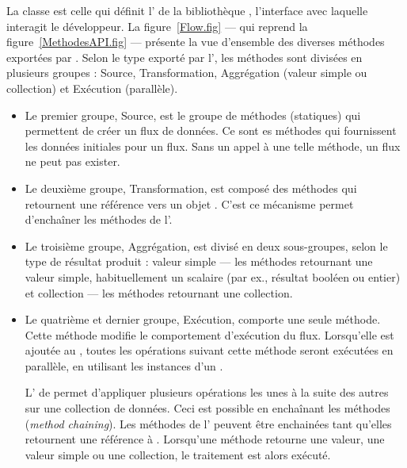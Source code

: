La classe  est celle qui définit l' de la biblioth\`eque , l'interface avec laquelle interagit le d\'eveloppeur. La figure~\ref{Flow.fig} --- qui reprend la figure~\ref{MethodesAPI.fig} --- pr\'esente la vue d'ensemble des diverses m\'ethodes export\'ees par . Selon le type export\'e par l', les m\'ethodes sont divis\'ees en plusieurs groupes : Source, Transformation, Aggr\'egation (valeur simple ou collection) et Ex\'ecution (parallèle).

\begin{itemize}

\item Le premier groupe, Source, est le groupe de méthodes (statiques) qui permettent de créer un flux de donn\'ees. Ce sont es m\'ethodes qui fournissent les donn\'ees initiales pour un flux. Sans un appel \`a une telle m\'ethode, un flux ne peut pas exister. 

\item Le deuxi\`eme groupe, Transformation, est composé des m\'ethodes qui retournent une r\'ef\'erence vers un objet . C'est ce m\'ecanisme permet d'encha\^iner les m\'ethodes de l'.

\item Le troisi\`eme groupe, Aggr\'egation, est divis\'e en deux sous-groupes, selon le type de r\'esultat produit : valeur simple --- les m\'ethodes retournant une valeur simple, habituellement un scalaire (par ex., r\'esultat bool\'een ou entier) et collection --- les m\'ethodes retournant une collection.

\item Le quatrième et dernier groupe, Exécution, comporte une seule m\'ethode. Cette m\'ethode modifie le comportement d'ex\'ecution du flux. Lorsqu'elle est ajout\'ee au  , toutes les op\'erations suivant cette m\'ethode seront ex\'ecut\'ees en parall\`ele, en utilisant les instances d'un  .

L' de  permet d'appliquer plusieurs op\'erations les unes à la suite des autres sur une collection de donn\'ees. Ceci est possible en encha\^inant les m\'ethodes (\emph{method chaining}). Les m\'ethodes de l' peuvent \^etre enchain\'ees tant qu'elles retournent une r\'ef\'erence \`a . Lorsqu'une m\'ethode retourne une valeur, une valeur simple ou une collection, le traitement est alors ex\'ecut\'e. 

\end{itemize}





